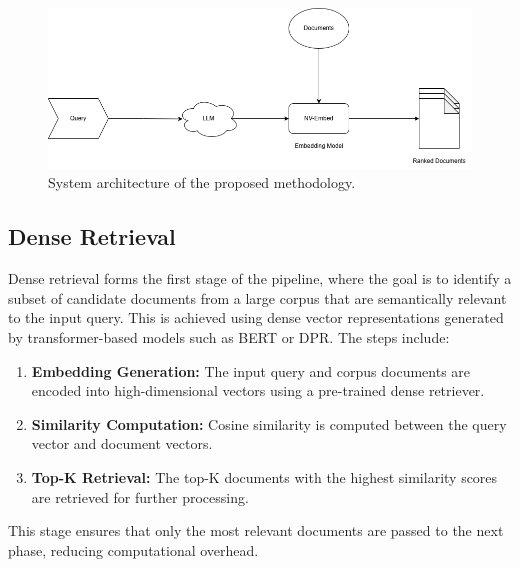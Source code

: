 \begin{figure}[ht]
    \centering
    \includegraphics[width=\linewidth]{IMAGE/RAG_HyDE_archi.png} %
    \caption{System architecture of the proposed methodology.}
    \label{fig:system_architecture}
\end{figure}

\subsection{Dense Retrieval}
Dense retrieval forms the first stage of the pipeline, where the goal is to identify a subset of candidate documents from a large corpus that are semantically relevant to the input query. This is achieved using dense vector representations generated by transformer-based models such as BERT or DPR. The steps include:
\begin{enumerate}
    \item \textbf{Embedding Generation:} The input query and corpus documents are encoded into high-dimensional vectors using a pre-trained dense retriever.
    \item \textbf{Similarity Computation:} Cosine similarity is computed between the query vector and document vectors.
    \item \textbf{Top-K Retrieval:} The top-K documents with the highest similarity scores are retrieved for further processing.
\end{enumerate}

This stage ensures that only the most relevant documents are passed to the next phase, reducing computational overhead.

